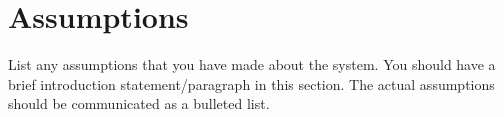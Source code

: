 \documentclass{report}
\begin{document}
\section{Assumptions}
\label{sec:assume}
List any assumptions that you have made about the system. You should have a brief introduction statement/paragraph in this section. The actual assumptions should be communicated as a bulleted list.\par


%



\end{document}
